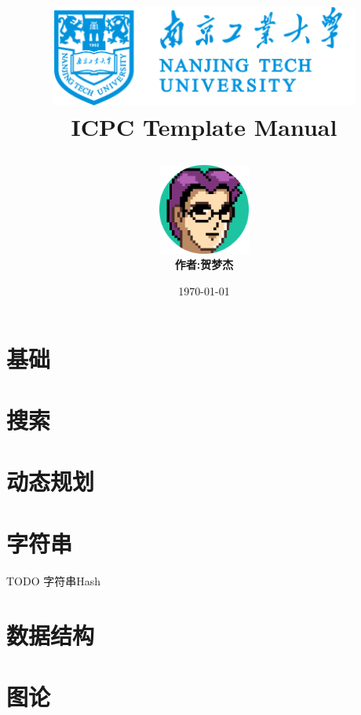 \documentclass[10pt,a4paper,oneside]{book}
\title{
    \begin{center}
        \includegraphics[width=4in]{logo.png}
        \\ 
        \textbf{ICPC Template Manual}
    \end{center}
}
\author{
    \includegraphics[width=3cm]{author.png}
    \\
    \textbf{作者:贺梦杰}
}
\date{\today}
\begin{document}
    \maketitle
    \tableofcontents

    \chapter{基础}
    

    \chapter{搜索}

    \chapter{动态规划}
    
    
    
    

    \chapter{字符串}
    TODO 字符串Hash
    
    
    


    \chapter{数据结构}
    
    
    
    
    
    
    
    
    

    \chapter{图论}
    
    
    
    
    
    
    
    
    
    
\end{document}
